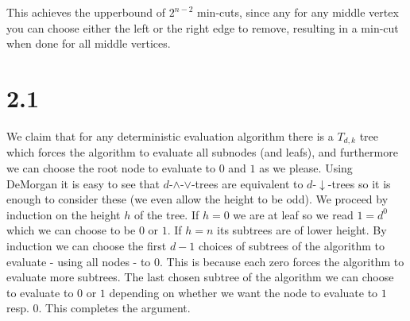\documentclass{article}
\begin{document}
This achieves the upperbound of $2^{n-2}$ min-cuts, since any for any middle vertex you can choose either the left or the right edge to remove, resulting in a min-cut when done for all middle vertices.

\section*{2.1}

We claim that for any deterministic evaluation algorithm there is a $T_{d,k}$ tree which forces the algorithm to evaluate all subnodes (and leafs), and furthermore we can choose the root node to evaluate to $0$ and $1$ as we please.
Using DeMorgan it is easy to see that $d$-$\land$-$\lor$-trees are equivalent to $d$-$\downarrow$-trees so it is enough to consider these (we even allow the height to be odd).
We proceed by induction on the height $h$ of the tree. 
If $h = 0$ we are at leaf so we read $1 = d^0$ which we can choose to be $0$ or $1$.
If $h = n$ its subtrees are of lower height. 
By induction we can choose the first $d-1$ choices of subtrees of the algorithm to evaluate - using all nodes - to 0.
This is because each zero forces the algorithm to evaluate more subtrees.
The last chosen subtree of the algorithm we can choose to evaluate to $0$ or $1$ depending on whether we want the node to evaluate to $1$ resp. $0$.
This completes the argument.
\end{document}
